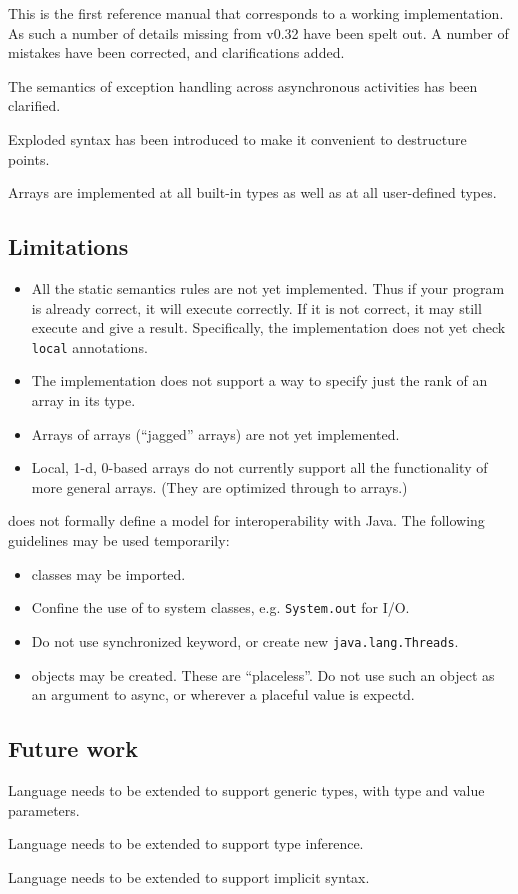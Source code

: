 
This is the first reference manual that corresponds to a working
implementation. As such a number of details missing from v0.32 have
been spelt out. A number of mistakes have been corrected, and
clarifications added.

The semantics of exception handling across asynchronous activities has
been clarified.

Exploded syntax has been introduced to make it convenient to
destructure points. 

Arrays are implemented at all built-in types as well as at all
user-defined types.

\subsection{Limitations}

\begin{itemize}
\item All the static semantics rules are not yet implemented. 
Thus if your program is already correct, it will execute correctly. If
it is not correct, it may still execute and give a
result. Specifically, the implementation does not yet check {\tt
local} annotations.

\item The implementation does not support a way to specify just the rank of
an array in its type.

\item Arrays of arrays (``jagged'' arrays) are not yet implemented.

\item Local, 1-d, 0-based arrays do not currently support all the
functionality of more general arrays. (They are optimized through to
\Java{} arrays.)

\end{itemize}

\XtenCurrVer{} does not formally define a model for interoperability with
Java. The following guidelines may be used temporarily:

\begin{itemize}
  \item \Java{} classes may be imported.
  \item Confine the use of \Java{} to system classes, e.g.{}
{\tt  System.out} for I/O.
  \item Do not use synchronized keyword, or create new {\tt java.lang.Threads}. 
  \item \Java{} objects may be created. These are ``placeless''. Do not use
     such an object as an argument to async, or wherever a placeful
     value is expectd.
\end{itemize}

\subsection{Future work}

Language needs to be extended to support generic types, with
type and value parameters.

Language needs to be extended to support type inference.

Language needs to be extended to support implicit syntax.